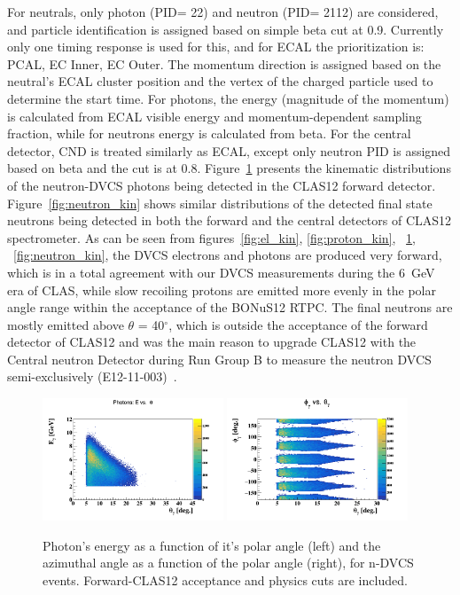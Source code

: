 For neutrals, only photon (PID= 22) and neutron (PID= 2112) are considered, and 
particle identification is assigned based on simple beta cut at 0.9. Currently 
only one timing response is used for this, and for ECAL the prioritization is: 
PCAL, EC Inner, EC Outer. The momentum direction is assigned based on the 
neutral's ECAL cluster position and the vertex of the charged particle used to 
determine the start time. For photons, the energy (magnitude of the momentum) 
is calculated from ECAL visible energy and momentum-dependent sampling 
fraction, while for neutrons energy is calculated from beta. For the central 
detector, CND is treated similarly as ECAL, except only neutron PID is assigned 
based on beta and the cut is at 0.8. Figure~\ref{fig:photon_kin} presents the 
kinematic distributions of the neutron-DVCS photons being detected in the 
CLAS12 forward detector. Figure~\ref{fig:neutron_kin} shows similar 
distributions of the detected final state neutrons being detected in both the 
forward and the central detectors of CLAS12 spectrometer. As can be seen from 
figures~\ref{fig:el_kin}, \ref{fig:proton_kin}, ~\ref{fig:photon_kin}, 
~\ref{fig:neutron_kin}, the DVCS electrons and photons are produced very 
forward, which is in a total agreement with our DVCS measurements during the 
6~GeV era of CLAS, while slow recoiling protons are emitted more evenly in the 
polar angle range within the acceptance of the BONuS12 RTPC. The final neutrons 
are mostly emitted above $\theta$ = 40$^{\circ}$, which is outside the 
acceptance of the forward detector of CLAS12 and was the main reason to upgrade 
CLAS12 with the Central neutron Detector during Run Group B to measure the 
neutron DVCS semi-exclusively (E12-11-003)~\cite{neutronDVCS}.  


\begin{figure}[htb]
\centering
   \includegraphics[width=0.48\textwidth,clip,trim=0mm 0mm 0mm 
   20mm]{figs/gamma_E_theta.png}
\includegraphics[width=0.48\textwidth,clip,trim=0mm 0mm 0mm 
   20mm]{figs/gamma_phi_theta.png}
   \caption{Photon's energy as a function of it's polar angle (left) and the 
   azimuthal angle as a function of the polar angle (right), for n-DVCS events.  
   Forward-CLAS12 acceptance and physics cuts are included.}
   \label{fig:photon_kin}
\end{figure}
 

